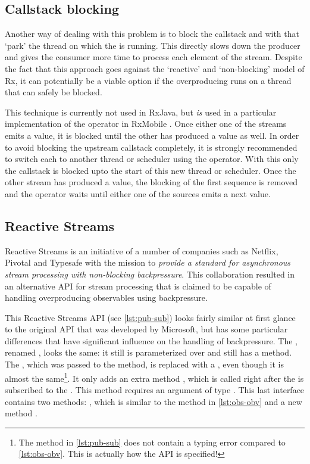 \subsection{Callstack blocking}
\label{subsec:callstack-blocking}
Another way of dealing with this problem is to block the callstack and with that `park' the thread on which the \obs is running. This directly slows down the producer and gives the consumer more time to process each element of the stream. Despite the fact that this approach goes against the `reactive' and `non-blocking' model of Rx, it can potentially be a viable option if the overproducing \obs runs on a thread that can safely be blocked.

This technique is currently not used in RxJava\cite{RxJava-Wiki-Callstack-Blocking}, but \emph{is} used in a particular implementation of the  operator in RxMobile \cite{RxMobile}. Once either one of the streams emits a value, it is blocked until the other \obs has produced a value as well. In order to avoid blocking the upstream callstack completely, it is strongly recommended to switch each \obs to another thread or scheduler using the  operator. With this only the callstack is blocked upto the start of this new thread or scheduler. Once the other stream has produced a value, the blocking of the first \obs sequence is removed and the  operator waits until either one of the sources emits a next value.

\subsection{Reactive Streams}
\label{subsec:reactive-streams}
Reactive Streams is an initiative \cite{Reactive-Streams} of a number of companies such as Netflix, Pivotal and Typesafe with the mission to \textit{provide a standard for asynchronous stream processing with non-blocking backpressure}. This collaboration resulted in an alternative API \cite{Reactive-Streams-API} for stream processing that is claimed to be capable of handling overproducing observables using backpressure.

This Reactive Streams API (see \autoref{lst:pub-sub}) looks fairly similar at first glance to the original API that was developed by Microsoft, but has some particular differences that have significant influence on the handling of backpressure. The \obs, renamed , looks the same: it still is parameterized over  and still has a  method. The \obv, which was passed to the  method, is replaced with a , even though it is almost the same\footnote{The  method in \autoref{lst:pub-sub} does not contain a typing error compared to \autoref{lst:obs-obv}. This is actually how the API is specified!}. It only adds an extra method , which is called right after the  is subscribed to the . This  method requires an argument of type . This last interface contains two methods: , which is similar to the  method in \autoref{lst:obs-obv} and a new method .


